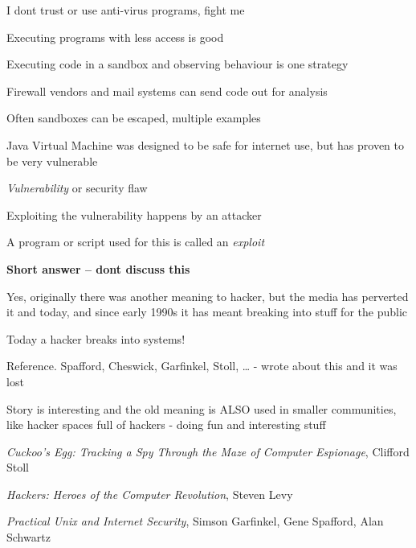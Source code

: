\documentclass[Screen16to9,17pt]{foils}
\begin{document}
\centerline{I dont trust or use anti-virus programs, fight me}



\begin{list1}
\item Executing programs with less access is good
\item Executing code in a sandbox and observing behaviour is one strategy
\item Firewall vendors and mail systems can send code out for analysis
\item Often sandboxes can be escaped, multiple examples
\item Java Virtual Machine was designed to be safe for internet use, but has proven to be very vulnerable
\end{list1}










\begin{list1}
\item \emph{Vulnerability} or security flaw
\item Exploiting the vulnerability happens by an attacker
\item A program or script used for this is called an \emph{exploit}
\end{list1}






{\bfseries Short answer -- dont discuss this}

Yes, originally there was another meaning to hacker, but the media has perverted it and today, and since early 1990s it has meant breaking into stuff for the public

{\color{red}\hlkbig Today a hacker breaks into systems!}

Reference. Spafford, Cheswick, Garfinkel, Stoll, \ldots
- wrote about this and it was lost

Story is interesting and the old meaning is ALSO used in smaller communities, like hacker spaces full of hackers - doing fun and interesting stuff
\begin{list2}
\item \emph{Cuckoo's Egg: Tracking a Spy Through the Maze of Computer
 Espionage},  Clifford Stoll
\item \emph{Hackers: Heroes of the Computer Revolution},
Steven Levy
\item \emph{Practical Unix and Internet Security},
Simson Garfinkel, Gene Spafford, Alan Schwartz
\end{list2}
\end{document}
